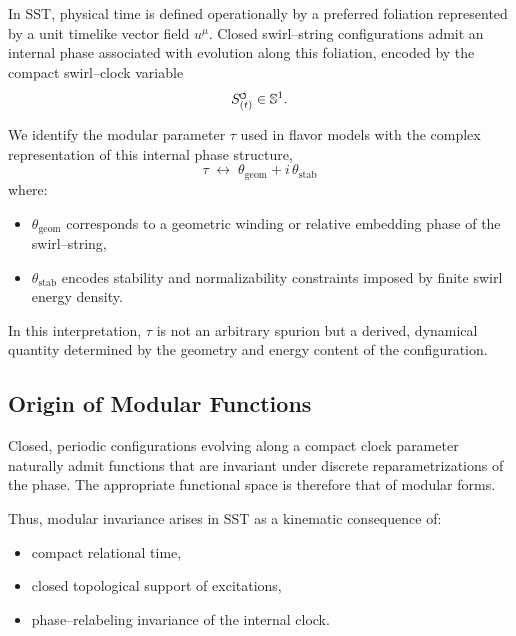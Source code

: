 \documentclass[11pt]{article}
\newcommand{\SwirlClock}{S_{(t)}^{\mkern-2mu\scriptscriptstyle\boldsymbol{\circlearrowleft}}}
\begin{document}
            In SST, physical time is defined operationally by a preferred foliation
            represented by a unit timelike vector field $u^\mu$.
            Closed swirl--string configurations admit an internal phase associated with
            evolution along this foliation, encoded by the compact swirl--clock variable
            \begin{equation}
                \SwirlClock \in \mathbb{S}^1 .
            \end{equation}

            We identify the modular parameter $\tau$ used in flavor models with the complex
            representation of this internal phase structure,
            \begin{equation}
                \boxed{
                    \tau
                    \;\longleftrightarrow\;
                    \theta_{\mathrm{geom}}
                    +
                    i\,\theta_{\mathrm{stab}}
                }
            \end{equation}
            where:
            \begin{itemize}
                \item $\theta_{\mathrm{geom}}$ corresponds to a geometric winding or relative
                embedding phase of the swirl--string,
                \item $\theta_{\mathrm{stab}}$ encodes stability and normalizability constraints
                imposed by finite swirl energy density.
            \end{itemize}

            In this interpretation, $\tau$ is not an arbitrary spurion but a derived,
            dynamical quantity determined by the geometry and energy content of the
            configuration.

        \subsection{Origin of Modular Functions}

            Closed, periodic configurations evolving along a compact clock parameter
            naturally admit functions that are invariant under discrete reparametrizations
            of the phase.
            The appropriate functional space is therefore that of modular forms.

            Thus, modular invariance arises in SST as a kinematic consequence of:
            \begin{itemize}
                \item compact relational time,
                \item closed topological support of excitations,
                \item phase--relabeling invariance of the internal clock.
            \end{itemize}
\end{document}
